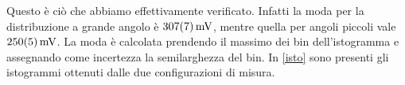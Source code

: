 Questo è ciò che abbiamo effettivamente verificato.
Infatti la moda per la distribuzione a grande angolo è $\SI{307\pm7}{mV}$,
mentre quella per angoli piccoli vale $\SI{250\pm5}{mV}$.
La moda è calcolata prendendo il massimo dei bin dell'istogramma e assegnando come incertezza la semilarghezza del bin.
In \autoref{isto} sono presenti gli istogrammi ottenuti dalle due configurazioni di misura.
